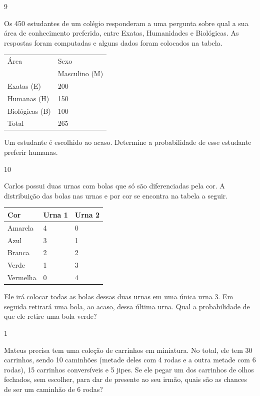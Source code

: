 \begin{escolha}
{\begin{escolha}

\num{9}

Os 450 estudantes de um colégio responderam a uma pergunta sobre qual a
sua área de conhecimento preferida, entre Exatas, Humanidades e
Biológicas. As respostas foram computadas e alguns dados foram colocados
na tabela.

\begin{longtable}[]{@{}ll@{}}
\toprule
Área & Sexo\tabularnewline
& Masculino (M)\tabularnewline
Exatas (E) & 200\tabularnewline
Humanas (H) & 150\tabularnewline
Biológicas (B) & 100\tabularnewline
Total & 265\tabularnewline
\bottomrule
\end{longtable}

Um estudante é escolhido ao acaso. Determine a probabilidade de esse
estudante preferir humanas.


\num{10}

Carlos possui duas urnas com bolas que só são diferenciadas pela cor. A
distribuição das bolas nas urnas e por cor se encontra na tabela a
seguir.

\begin{longtable}[]{@{}lll@{}}
\toprule
Cor & Urna 1 & Urna 2\tabularnewline
\midrule
\endhead
Amarela & 4 & 0\tabularnewline
Azul & 3 & 1\tabularnewline
Branca & 2 & 2\tabularnewline
Verde & 1 & 3\tabularnewline
Vermelha & 0 & 4\tabularnewline
\bottomrule
\end{longtable}

Ele irá colocar todas as bolas dessas duas urnas em uma única urna 3. Em
seguida retirará uma bola, ao acaso, dessa última urna. Qual a
probabilidade de que ele retire uma bola verde?



\num{1}

Mateus precisa tem uma coleção de carrinhos em miniatura. No total, ele tem 30 carrinhos, sendo 10 caminhões (metade deles com 4 rodas e a outra metade com 6 rodas), 15 carrinhos conversíveis e 5 jipes. Se ele pegar um dos carrinhos de olhos fechados, sem escolher, para dar de presente ao seu irmão, quais são as chances de ser um caminhão de 6 rodas?


\end{escolha}}
\end{escolha}
